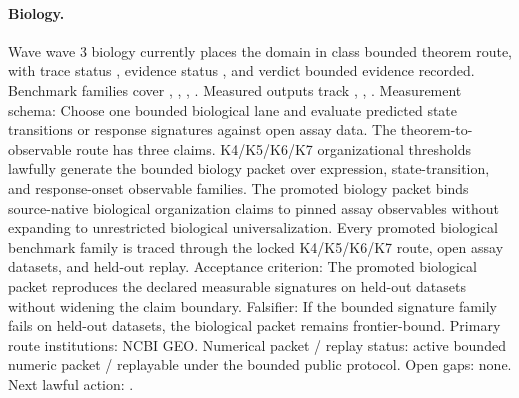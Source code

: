\paragraph{Biology.}
Wave wave 3 biology currently places the domain in class bounded theorem route, with trace status , evidence status , and verdict bounded evidence recorded.
Benchmark families cover , \allowbreak {}, \allowbreak {}, \allowbreak {}.
Measured outputs track , \allowbreak {}, \allowbreak {}.
Measurement schema: Choose one bounded biological lane and evaluate predicted state transitions or response signatures against open assay data.
The theorem-to-observable route has three claims. K4/K5/K6/K7 organizational thresholds lawfully generate the bounded biology packet over expression, state-transition, and response-onset observable families. The promoted biology packet binds source-native biological organization claims to pinned assay observables without expanding to unrestricted biological universalization. Every promoted biological benchmark family is traced through the locked K4/K5/K6/K7 route, open assay datasets, and held-out replay.
Acceptance criterion: The promoted biological packet reproduces the declared measurable signatures on held-out datasets without widening the claim boundary.
Falsifier: If the bounded signature family fails on held-out datasets, the biological packet remains frontier-bound.
Primary route institutions: NCBI GEO.
Numerical packet / replay status: active bounded numeric packet / replayable under the bounded public protocol.
Open gaps: none.
Next lawful action: .


